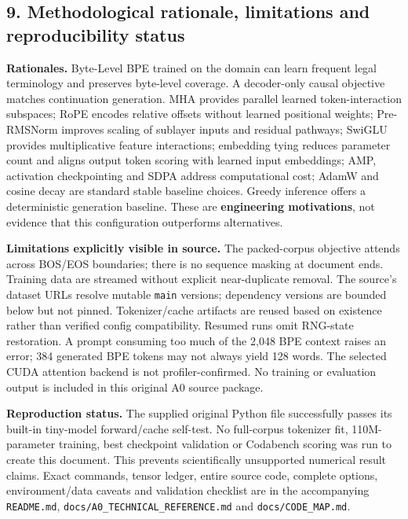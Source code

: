 \subsection{9. Methodological rationale, limitations and reproducibility
status}\label{methodological-rationale-limitations-and-reproducibility-status}

\textbf{Rationales.} Byte-Level BPE trained on the domain can learn
frequent legal terminology and preserves byte-level coverage. A
decoder-only causal objective matches continuation generation. MHA
provides parallel learned token-interaction subspaces; RoPE encodes
relative offsets without learned positional weights; Pre-RMSNorm
improves scaling of sublayer inputs and residual pathways; SwiGLU
provides multiplicative feature interactions; embedding tying reduces
parameter count and aligns output token scoring with learned input
embeddings; AMP, activation checkpointing and SDPA address computational
cost; AdamW and cosine decay are standard stable baseline choices.
Greedy inference offers a deterministic generation baseline. These are
\textbf{engineering motivations}, not evidence that this configuration
outperforms alternatives.

\textbf{Limitations explicitly visible in source.} The packed-corpus
objective attends across BOS/EOS boundaries; there is no sequence
masking at document ends. Training data are streamed without explicit
near-duplicate removal. The source's dataset URLs resolve mutable
\texttt{main} versions; dependency versions are bounded below but not
pinned. Tokenizer/cache artifacts are reused based on existence rather
than verified config compatibility. Resumed runs omit RNG-state
restoration. A prompt consuming too much of the 2,048 BPE context raises
an error; 384 generated BPE tokens may not always yield 128 words. The
selected CUDA attention backend is not profiler-confirmed. No training
or evaluation output is included in this original A0 source package.

\textbf{Reproduction status.} The supplied original Python file
successfully passes its built-in tiny-model forward/cache self-test. No
full-corpus tokenizer fit, 110M-parameter training, best checkpoint
validation or Codabench scoring was run to create this document. This
prevents scientifically unsupported numerical result claims. Exact
commands, tensor ledger, entire source code, complete options,
environment/data caveats and validation checklist are in the
accompanying \texttt{README.md},
\texttt{docs/A0\_TECHNICAL\_REFERENCE.md} and
\texttt{docs/CODE\_MAP.md}.

